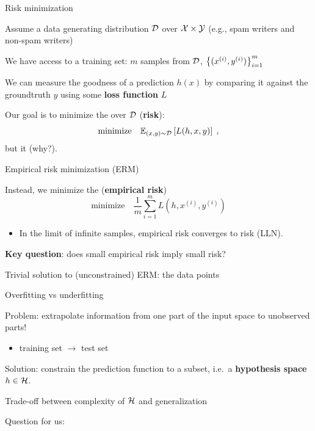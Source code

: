 \documentclass[usenames,dvipsnames,notes,11pt,aspectratio=169]{beamer}
\begin{document}
\begin{frame}
    {Risk minimization}

    \begin{wideitemize}[<+->]
        \item Assume a data generating distribution $\mathcal{D}$ over $\mathcal{X}\times\mathcal{Y}$ (e.g., spam writers and non-spam writers)
        \item We have access to a training set: $m$ samples from $\mathcal{D}$, $\left\{ (x^{(i)}, y^{(i)}) \right\}_{i=1}^m$
        \item We can measure the goodness of a prediction $h(x)$ by comparing it against the groundtruth $y$ using some \textbf{loss function} $L$
        \item Our goal is to minimize the  over $\mathcal{D}$ (\textbf{risk}):
            $$
\text{minimize}\quad \mathbb{E}_{(x,y)\sim\mathcal{D}}\left[ L(h,x,y) \right] \;,
            $$
            but it  (why?).
    \end{wideitemize}
\end{frame}

\begin{frame}
    {Empirical risk minimization (ERM)}

    \begin{wideitemize}[<+->]
        \item Instead, we minimize the  (\textbf{empirical risk})  %
    $$
    \text{minimize}\quad \frac{1}{m}\sum_{i=1}^m L(h, x^{(i)}, y^{(i)})
    $$
            \begin{itemize}
                \item {In the limit of infinite samples, empirical risk converges to risk (LLN).}
            \end{itemize}
        \item {\bf Key question}: does small empirical risk imply small risk? 
        \item Trivial solution to (unconstrained) ERM:  the data points
    \end{wideitemize}
\end{frame}

\begin{frame}
    {Overfitting vs underfitting}
    \begin{wideitemize}
        \item Problem: extrapolate information from one part of the input space to unobserved parts!
            \begin{itemize}
                \item training set $\to$ test set
            \end{itemize}
        \item Solution: constrain the prediction function to a subset, i.e.\ a \textbf{hypothesis space} $h\in \mathcal{H}$.
            \pause
        \item Trade-off between complexity of $\mathcal{H}$ and generalization 
        \item Question for us: 
    \end{wideitemize}
\end{frame}
\end{document}
